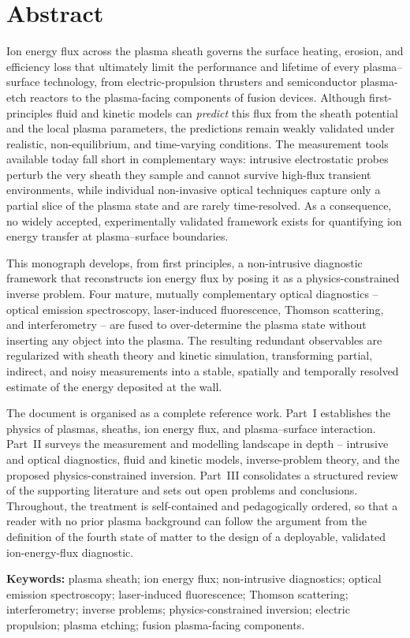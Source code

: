 \chapter*{Abstract}

Ion energy flux across the plasma sheath governs the surface heating, erosion, and
efficiency loss that ultimately limit the performance and lifetime of every
plasma--surface technology, from electric-propulsion thrusters and semiconductor
plasma-etch reactors to the plasma-facing components of fusion devices. Although
first-principles fluid and kinetic models can \emph{predict} this flux from the
sheath potential and the local plasma parameters, the predictions remain weakly
validated under realistic, non-equilibrium, and time-varying conditions. The
measurement tools available today fall short in complementary ways: intrusive
electrostatic probes perturb the very sheath they sample and cannot survive
high-flux transient environments, while individual non-invasive optical
techniques capture only a partial slice of the plasma state and are rarely
time-resolved. As a consequence, no widely accepted, experimentally validated
framework exists for quantifying ion energy transfer at plasma--surface
boundaries.

This monograph develops, from first principles, a non-intrusive diagnostic
framework that reconstructs ion energy flux by posing it as a physics-constrained
inverse problem. Four mature, mutually complementary optical diagnostics --
optical emission spectroscopy, laser-induced fluorescence, Thomson scattering,
and interferometry -- are fused to over-determine the plasma state without
inserting any object into the plasma. The resulting redundant observables are
regularized with sheath theory and kinetic simulation, transforming partial,
indirect, and noisy measurements into a stable, spatially and temporally resolved
estimate of the energy deposited at the wall.

The document is organised as a complete reference work. Part~I establishes the
physics of plasmas, sheaths, ion energy flux, and plasma--surface interaction.
Part~II surveys the measurement and modelling landscape in depth -- intrusive and
optical diagnostics, fluid and kinetic models, inverse-problem theory, and the
proposed physics-constrained inversion. Part~III consolidates a structured
review of the supporting literature and sets out open problems and conclusions. Throughout, the
treatment is self-contained and pedagogically ordered, so that a reader with no
prior plasma background can follow the argument from the definition of the fourth
state of matter to the design of a deployable, validated ion-energy-flux
diagnostic.

\vspace{0.5cm}
\noindent\textbf{Keywords:} plasma sheath; ion energy flux; non-intrusive
diagnostics; optical emission spectroscopy; laser-induced fluorescence; Thomson
scattering; interferometry; inverse problems; physics-constrained inversion;
electric propulsion; plasma etching; fusion plasma-facing components.
\cleardoublepage
